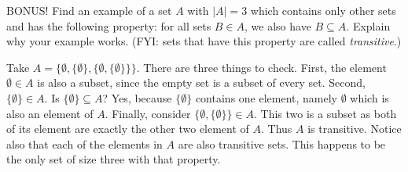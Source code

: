 \documentclass[11pt]{exam}
\begin{document}
\begin{questions}






\bonusquestion[3] BONUS! Find an example of a set $A$ with $|A| = 3$ which contains only other sets and  has the following property: for all sets $B \in A$, we also have $B \subseteq A$.  Explain why your example works.  (FYI: sets that have this property are called {\em transitive}.)

\begin{solution}
Take $A = \{\emptyset, \{\emptyset\}, \{\emptyset, \{\emptyset\}\}\}$.  There are three things to check.  First, the element $\emptyset \in A$ is also a subset, since the empty set is a subset of every set.  Second, $\{\emptyset\}\in A$.  Is $\{\emptyset\} \subseteq A$?  Yes, because $\{\emptyset\}$ contains one element, namely $\emptyset$ which is also an element of $A$.  Finally, consider $\{\emptyset, \{\emptyset\}\}\in A$.  This two is a subset as both of its element are exactly the other two element of $A$.  Thus $A$ is transitive.  Notice also that each of the elements in $A$ are also transitive sets.  This happens to be the only set of size three with that property.
\end{solution}



\end{questions}
\end{document}
